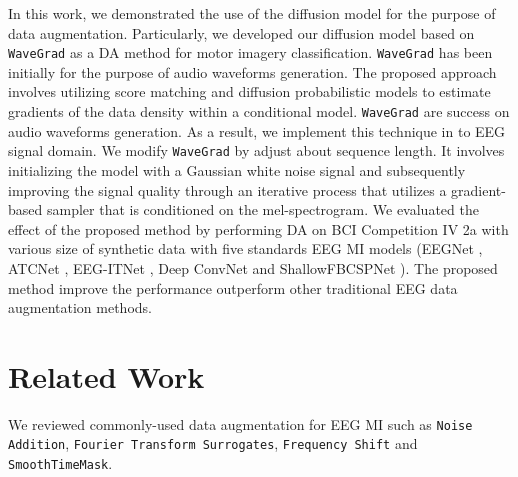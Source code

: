 \documentclass[runningheads]{llncs}
\begin{document}

In this work,  we demonstrated the use of the diffusion model for the purpose of data augmentation.  Particularly, we developed our diffusion model based on \texttt{WaveGrad} \cite{chen2020wavegrad} as a DA method for motor imagery classification.  \texttt{WaveGrad} has been initially for the purpose of audio waveforms generation.  The proposed approach involves utilizing score matching \cite{song2020sliced} and diffusion probabilistic models to estimate gradients of the data density within a conditional model. \texttt{WaveGrad} are success on audio waveforms generation. As a result, we implement this technique in to EEG signal domain. We modify \texttt{WaveGrad} by adjust about sequence length.   It involves initializing the model with a Gaussian white noise signal and subsequently improving the signal quality through an iterative process that utilizes a gradient-based sampler that is conditioned on the mel-spectrogram. We evaluated the effect of the proposed method by performing DA on BCI Competition IV 2a \cite{brunner2008bci} with various size of synthetic data with five standards EEG MI models (EEGNet \cite{lawhern2018eegnet}, ATCNet \cite{altaheri2022physics}, EEG-ITNet \cite{salami2022eeg}, Deep ConvNet \cite{schirrmeister2017deep} and ShallowFBCSPNet \cite{schirrmeister2017deep}). The proposed method improve the performance outperform other traditional EEG data augmentation methods. 

\section{Related Work}

\begin{sloppypar}    
We reviewed commonly-used data augmentation for EEG MI such as \texttt{Noise Addition}, \texttt{Fourier Transform Surrogates}, \texttt{Frequency Shift} and \texttt{SmoothTimeMask}.
\end{sloppypar}
\end{document}
